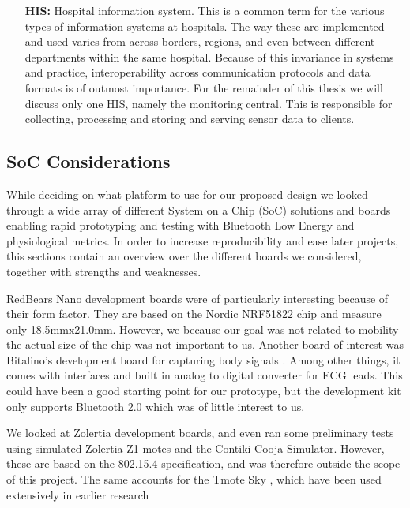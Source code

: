 \begin{itemize}
  \item[\textbf{HIS:}] Hospital information system. This is a common term for the various types of information systems at hospitals. The way these are implemented and used varies from across borders, regions, and even between different departments within the same hospital. Because of this invariance in systems and practice, interoperability across communication protocols and data formats is of outmost importance. For the remainder of this thesis we will discuss only one HIS, namely the monitoring central. This is responsible for collecting, processing and storing and serving sensor data to clients.

\end{itemize}


\subsection{SoC Considerations} %
\label{sub:soc_considerations}

While deciding on what platform to use for our proposed design we looked through a wide array of different System on a Chip (SoC) solutions and boards enabling rapid prototyping and testing with Bluetooth Low Energy and physiological metrics. In order to increase reproducibility and ease later projects, this sections contain an overview over the different boards we considered, together with strengths and weaknesses.

RedBears Nano \cite{newRef:36} development boards were of particularly interesting because of their form factor. They are based on the Nordic NRF51822 chip and measure only 18.5mmx21.0mm. However, we because our goal was not related to mobility the actual size of the chip was not important to us. Another board of interest was Bitalino's development board for capturing body signals \cite{newRef:37}. Among other things, it comes with interfaces and built in analog to digital converter for ECG leads. This could have been a good starting point for our prototype, but the development kit only supports Bluetooth 2.0 which was of little interest to us.

We looked at Zolertia \cite{newRef:38} development boards, and even ran some preliminary tests using simulated Zolertia Z1 motes and the Contiki Cooja Simulator. However, these are based on the 802.15.4 specification, and was therefore outside the scope of this project. The same accounts for the Tmote Sky \cite{newRef:39}, which have been used extensively in earlier research \cite{Milenkovic:2006er, Owner:2006ub, ChulsungPark:2006tf, SteveWarren:2005ws, ChulsungPark:2006tf, Anonymous:GyP6wjY5}

